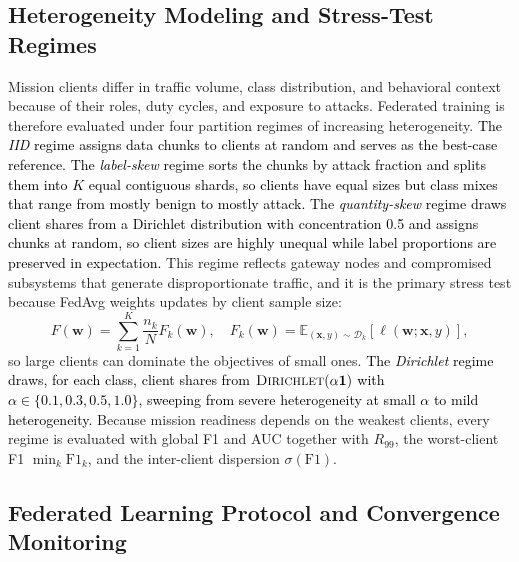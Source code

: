 \documentclass[conference]{IEEEtran}
\begin{document}
\subsection{Heterogeneity Modeling and Stress-Test Regimes}
\label{subsec:heterogeneity_modeling}

Mission clients differ in traffic volume, class distribution, and
behavioral context because of their roles, duty cycles, and exposure
to attacks. Federated training is therefore evaluated under four
partition regimes of increasing heterogeneity.
\textcolor{black}{The \textit{IID} regime assigns data chunks
to clients at random and serves as the best-case reference. The
\textit{label-skew} regime sorts the chunks by attack fraction and
splits them into $K$ equal contiguous shards, so clients have equal
sizes but class mixes that range from mostly benign to mostly attack.
The \textit{quantity-skew} regime draws client shares from a
Dirichlet distribution with concentration 0.5 and assigns chunks at
random, so client sizes are highly unequal while label proportions
are preserved in expectation.} This regime reflects gateway nodes and
compromised subsystems that generate disproportionate traffic, and it
is the primary stress test because FedAvg weights updates by client
sample size:
\begin{equation}
F(\mathbf{w})=\sum_{k=1}^{K}\frac{n_k}{N}F_k(\mathbf{w}),\quad
F_k(\mathbf{w})=\mathbb{E}_{(\mathbf{x},y)\sim\mathcal{D}_k}
[\ell(\mathbf{w};\mathbf{x},y)],
\label{eq:fedavg_weighted_obj}
\end{equation}
so large clients can dominate the objectives of small ones.
\textcolor{black}{The \textit{Dirichlet} regime draws, for
each class, client shares from $\textsc{Dirichlet}(\alpha\mathbf{1})$
with $\alpha\in\{0.1,0.3,0.5,1.0\}$, sweeping from severe heterogeneity
at small $\alpha$ to mild heterogeneity.} Because mission readiness
depends on the weakest clients, every regime is evaluated with global
F1 and AUC together with $R_{99}$, the worst-client F1
$\min_k\mathrm{F1}_k$, and the inter-client dispersion
$\sigma(\mathrm{F1})$.

\subsection{Federated Learning Protocol and Convergence
            Monitoring}
\label{subsec:federated_protocol_convergence}
\end{document}
